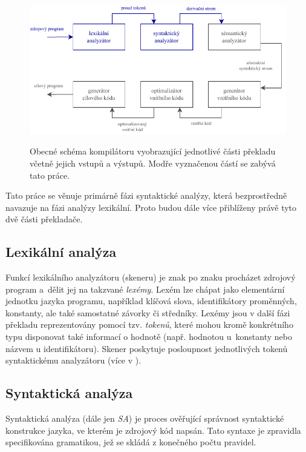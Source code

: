 \begin{figure}[h]\centering
  \centering
  \includegraphics[scale=1.1]{obrazky/CompilerShema.pdf}\\[1pt]

  \caption{Obecné schéma kompilátoru vyobrazující jednotlivé části překladu včetně jejich vstupů a výstupů. Modře vyznačenou částí se zabývá tato práce.}
  \label{obrSchemaKompilator}
\end{figure}

Tato práce se věnuje primárně fázi syntaktické analýzy, která bezprostředně navazuje na fázi analýzy lexikální. Proto budou dále více přiblíženy
právě tyto dvě části překladače.

\subsection*{Lexikální analýza}
Funkcí lexikálního analyzátoru (skeneru) je znak po znaku procházet zdrojový program a~dělit jej na takzvané \emph{lexémy}.
Lexém lze chápat jako elementární jednotku jazyka programu, například
klíčová slova, identifikátory proměnných, konstanty, ale také samostatné závorky či středníky.
Lexémy jsou v další fázi překladu reprezentovány pomocí tzv. \emph{tokenů}, které mohou kromě konkrétního typu disponovat také informací o
hodnotě (např. hodnotou u~konstanty nebo názvem u identifikátoru).
Skener poskytuje posloupnost jednotlivých tokenů syntaktickému analyzátoru (více v \cite{Alfred:2007:Compilers}).

\subsection*{Syntaktická analýza}
Syntaktická analýza (dále jen \emph{SA}) je proces ověřující správnost syntaktické konstrukce jazyka, ve kterém je zdrojový kód napsán. Tato syntaxe je zpravidla specifikována
gramatikou, jež se skládá z konečného počtu pravidel.

